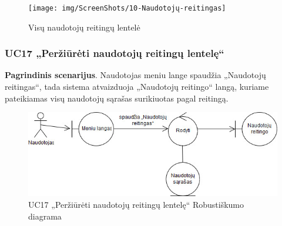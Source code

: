\documentclass{VUMIFPSbakalaurinis}
\begin{document}
\begin{figure}[H]
	\centering
	\texttt{[image: img/ScreenShots/10-Naudotojų-reitingas]}
	\caption{Visų naudotojų reitingų lentelė}
	\label{img:rating table}
\end{figure}
\subsubsection{UC17 „Peržiūrėti naudotojų reitingų lentelę“}
\textbf{Pagrindinis scenarijus}. Naudotojas meniu lange spaudžia „Naudotojų reitingas“, tada sistema atvaizduoja „Naudotojų reitingo“ langą, kuriame pateikiamas visų naudotojų sąrašas surikiuotas pagal reitingą.

\begin{figure}[H]
	\centering
	\includegraphics[scale=0.6]{img/Robustness/UC17}
	\caption{UC17 „Peržiūrėti naudotojų reitingų lentelę“ Robustiškumo diagrama}
	\label{img:uc17rob}
\end{figure}
\end{document}
